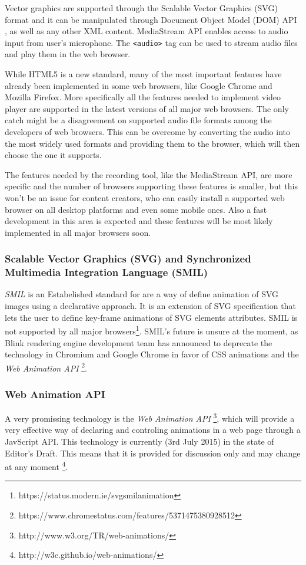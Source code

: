 Vector graphics are supported through the Scalable Vector Graphics (SVG) format \cite{} and it can be manipulated through Document Object Model (DOM) API \cite{}, as well as any other XML content. MediaStream API \cite{} enables access to audio input from user's microphone. The \verb|<audio>| tag can be used to stream audio files and play them in the web browser.

While HTML5 is a new standard, many of the most important features have already been implemented in some web browsers, like Google Chrome and Mozilla Firefox. More specifically all the features needed to implement video player are supported in the latest versions of all major web browsers. The only catch might be a disagreement on supported audio file formats among the developers of web browsers. This can be overcome by converting the audio into the most widely used formats and providing them to the browser, which will then choose the one it supports.

The features needed by the recording tool, like the MediaStream API, are more specific and the number of browsers supporting these features is smaller, but this won't be an issue for content creators, who can easily install a supported web browser on all desktop platforms and even some mobile ones. Also a fast development in this area is expected and these features will be most likely implemented in all major browsers soon.

\subsubsection*{Scalable Vector Graphics (SVG) and Synchronized Multimedia Integration Language (SMIL)}
\textit{SMIL} is an Estabelished standard for  are a way of define animation of SVG images using a declarative approach. It is an extension of SVG specification that lets the user to define key-frame animations of SVG elements attributes. SMIL is not supported by all major browsers\footnote{https://status.modern.ie/svgsmilanimation}. SMIL's future is unsure at the moment, as Blink rendering engine development team has announced to deprecate the technology in Chromium and Google Chrome in favor of CSS animations and the \textit{Web Animation API} \cite{} \footnote{https://www.chromestatus.com/features/5371475380928512}. 

\subsubsection*{Web Animation API}
A very promissing technology is the \textit{Web Animation API} \footnote{http://www.w3.org/TR/web-animations/}, which will provide a very effective way of declaring and controling animations in a web page through a JavScript API. This technology is currently (3rd July 2015) in the state of Editor's Draft. This means that it is provided for discussion only and may change at any moment \cite{} \footnote{http://w3c.github.io/web-animations/}.


